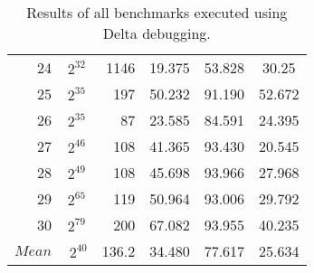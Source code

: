 \begin{table}[b!]
\begin{tabular}{rSrSSS}
    24 & {$2^{32}$} & 1146 & 19.375 & 53.828 & 30.25  \\
    25 & {$2^{35}$} & 197 & 50.232 & 91.190 & 52.672 \\
    26 & {$2^{35}$} & 87 & 23.585 & 84.591 & 24.395 \\
    27 & {$2^{46}$} & 108 & 41.365 & 93.430 & 20.545 \\
    28 & {$2^{49}$} & 108 & 45.698 & 93.966 & 27.968 \\
    29 & {$2^{65}$} & 119 & 50.964 & 93.006 & 29.792 \\
    30 & {$2^{79}$} & 200 & 67.082 & 93.955 & 40.235 \\	\midrule
	{$Mean$} & {$~2^{40}$} & 136.2 & 34.480 & 77.617 & 25.634 \\	\bottomrule
\end{tabular}
\caption{Results of all benchmarks executed using Delta debugging.}
\label{tab:delta}
\end{table}

